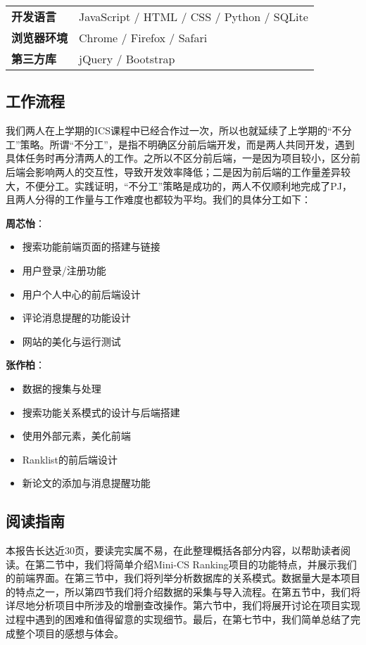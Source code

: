 \begin{table}[h]
\begin{tabular}{ll}
{\bf 开发语言}   & JavaScript / HTML / CSS / Python / SQLite \\
{\bf 浏览器环境} & Chrome / Firefox / Safari \\
{\bf 第三方库}   & jQuery / Bootstrap                             
\end{tabular}
\end{table}

\subsection{工作流程}

我们两人在上学期的ICS课程中已经合作过一次，所以也就延续了上学期的“不分工”策略。所谓“不分工”，是指不明确区分前后端开发，而是两人共同开发，遇到具体任务时再分清两人的工作。之所以不区分前后端，一是因为项目较小，区分前后端会影响两人的交互性，导致开发效率降低；二是因为前后端的工作量差异较大，不便分工。实践证明，“不分工”策略是成功的，两人不仅顺利地完成了PJ，且两人分得的工作量与工作难度也都较为平均。我们的具体分工如下：

\noindent
{\bf 周芯怡}：
\begin{itemize}
\item 搜索功能前端页面的搭建与链接
\item 用户登录/注册功能
\item 用户个人中心的前后端设计
\item 评论消息提醒的功能设计
\item 网站的美化与运行测试
\end{itemize}
{\bf 张作柏}：
\begin{itemize}
\item 数据的搜集与处理
\item 搜索功能关系模式的设计与后端搭建
\item 使用外部元素，美化前端
\item Ranklist的前后端设计
\item 新论文的添加与消息提醒功能
\end{itemize}

\subsection{阅读指南}

本报告长达近30页，要读完实属不易，在此整理概括各部分内容，以帮助读者阅读。在第二节中，我们将简单介绍Mini-CS Ranking项目的功能特点，并展示我们的前端界面。在第三节中，我们将列举分析数据库的关系模式。数据量大是本项目的特点之一，所以第四节我们将介绍数据的采集与导入流程。在第五节中，我们将详尽地分析项目中所涉及的增删查改操作。第六节中，我们将展开讨论在项目实现过程中遇到的困难和值得留意的实现细节。最后，在第七节中，我们简单总结了完成整个项目的感想与体会。

